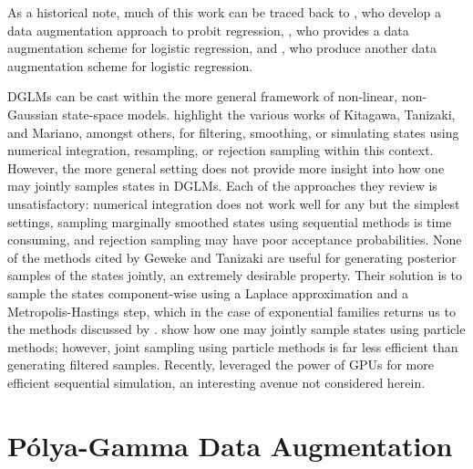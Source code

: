 \documentclass[12pt]{article}
\newcommand{\Polya}{P\'{o}lya}
\begin{document}
As a historical note, much of this work can be traced back to
\cite{albert-chib-1993}, who develop a data augmentation approach to probit
regression, \cite{mcfadden-1974}, who provides a data augmentation scheme for
logistic regression, and \cite{holmes-held-2006}, who produce another data
augmentation scheme for logistic regression.

DGLMs can be cast within the more general framework of non-linear, non-Gaussian
state-space models.  \cite{geweke-tanizaki-2001} highlight the various works of
Kitagawa, Tanizaki, and Mariano, amongst others, for filtering, smoothing, or
simulating states using numerical integration, resampling, or rejection sampling
within this context.  However, the more general setting does not provide more
insight into how one may jointly samples states in DGLMs.  Each of the
approaches they review is unsatisfactory: numerical integration does not work
well for any but the simplest settings, sampling marginally smoothed states
using sequential methods is time consuming, and rejection sampling may have poor
acceptance probabilities.  None of the methods cited by Geweke and Tanizaki are
useful for generating posterior samples of the states jointly, an extremely
desirable property.  Their solution is to sample the states component-wise using
a Laplace approximation and a Metropolis-Hastings step, which in the case of
exponential families returns us to the methods discussed by
\citep{gamerman-1998}.  \cite{godsill-etal-2004} show how one may jointly sample
states using particle methods; however, joint sampling using particle methods is
far less efficient than generating filtered samples.  Recently,
\cite{geweke-etal-2013} leveraged the power of GPUs for more efficient
sequential simulation, an interesting avenue not considered herein.

\section{\Polya-Gamma Data Augmentation}
\label{sec:pg}
\end{document}
